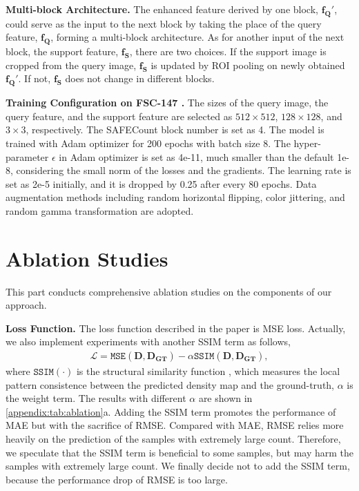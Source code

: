 \documentclass[10pt,twocolumn,letterpaper]{article}
\newcommand{\method}{SAFECount\xspace}
\newcommand{\fs}{\bm{f_S}}
\newcommand{\fq}{\bm{f_Q}}
\newcommand{\fout}{\bm{f_Q'}}
\begin{document}
\vspace{2pt}\noindent\textbf{Multi-block Architecture.} The enhanced feature derived by one block, $\fout$, could serve as the input to the next block by taking the place of the query feature, $\fq$, forming a multi-block architecture. As for another input of the next block, the support feature, $\fs$, there are two choices. If the support image is cropped from the query image, $\fs$ is updated by ROI pooling on newly obtained $\fout$. If not, $\fs$ does not change in different blocks. 


\vspace{2pt}\noindent\textbf{Training Configuration on FSC-147 \cite{famnet}.} 
The sizes of the query image, the query feature, and the support feature are selected as $512 \times 512$, $128 \times 128$, and $3 \times 3$, respectively. 
The \method block number is set as 4. 
The model is trained with Adam optimizer \cite{adam} for 200 epochs with batch size 8. 
The hyper-parameter $\epsilon$ in Adam optimizer is set as 4e-11, much smaller than the default 1e-8, considering the small norm of the losses and the gradients. 
The learning rate is set as 2e-5 initially, and it is dropped by 0.25 after every 80 epochs. 
Data augmentation methods including random horizontal flipping, color jittering, and random gamma transformation are adopted. 

 
\section{Ablation Studies}\label{appendix:sec:ablation}


This part conducts comprehensive ablation studies on the components of our approach.


\vspace{2pt}\noindent\textbf{Loss Function.}
The loss function described in the paper is MSE loss. Actually, we also implement experiments with another SSIM term as follows,
\begin{align}
    \mathcal{L} = \mathtt{MSE}(\bm{D}, \bm{D_{GT}}) - \alpha \mathtt{SSIM}(\bm{D}, \bm{D_{GT}}), \label{equ:loss}
\end{align}
where $\mathtt{SSIM}(\cdot)$ is the structural similarity function \cite{ssim}, which measures the local pattern consistence between the predicted density map and the ground-truth, $\alpha$ is the weight term. 
The results with different $\alpha$ are shown in \cref{appendix:tab:ablation}a. 
Adding the SSIM term promotes the performance of MAE but with the sacrifice of RMSE. 
Compared with MAE, RMSE relies more heavily on the prediction of the samples with extremely large count. 
Therefore, we speculate that the SSIM term is beneficial to some samples, but may harm the samples with extremely large count. 
We finally decide not to add the SSIM term, because the performance drop of RMSE is too large. 
\end{document}
